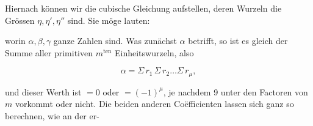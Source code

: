 
Hiernach können wir die cubische Gleichung aufstellen, deren Wurzeln die
Grössen $\eta, \eta', \eta''$ sind. Sie möge lauten:


worin $\alpha, \beta, \gamma$ ganze Zahlen sind. Was zunächst $\alpha$
betrifft, so ist es gleich der Summe aller primitiven $m^{\mathrm{ten}}$
Einheitswurzeln, also

\[ \alpha = \Sigma\, r_1\, \Sigma\, r_2 \ldots \Sigma\, r_\mu, \]

und dieser Werth ist $= 0$ oder $= (-1)^{\mu}$,
je nachdem 9 unter den Factoren von $m$ vorkommt oder nicht. Die beiden
anderen Co\"efficienten lassen sich ganz so berechnen, wie an der er-
